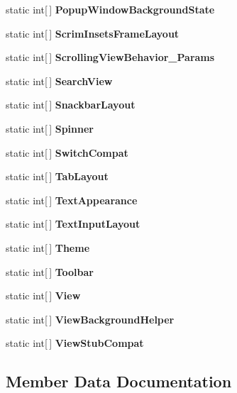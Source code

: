 \begin{DoxyCompactItemize}
static int\mbox{[}$\,$\mbox{]} {\bfseries Popup\+Window\+Background\+State}
\item 
static int\mbox{[}$\,$\mbox{]} {\bfseries Scrim\+Insets\+Frame\+Layout}
\item 
static int\mbox{[}$\,$\mbox{]} {\bfseries Scrolling\+View\+Behavior\+\_\+\+Params}
\item 
static int\mbox{[}$\,$\mbox{]} {\bfseries Search\+View}
\item 
static int\mbox{[}$\,$\mbox{]} {\bfseries Snackbar\+Layout}
\item 
static int\mbox{[}$\,$\mbox{]} {\bfseries Spinner}
\item 
static int\mbox{[}$\,$\mbox{]} {\bfseries Switch\+Compat}
\item 
static int\mbox{[}$\,$\mbox{]} {\bfseries Tab\+Layout}
\item 
static int\mbox{[}$\,$\mbox{]} {\bfseries Text\+Appearance}
\item 
static int\mbox{[}$\,$\mbox{]} {\bfseries Text\+Input\+Layout}
\item 
\hypertarget{classClient_1_1Droid_1_1Resource_1_1Styleable_adf7e6f965f31f895923bda5cad2dd1c1}{}static int\mbox{[}$\,$\mbox{]} {\bfseries Theme}\label{classClient_1_1Droid_1_1Resource_1_1Styleable_adf7e6f965f31f895923bda5cad2dd1c1}

\item 
static int\mbox{[}$\,$\mbox{]} {\bfseries Toolbar}
\item 
static int\mbox{[}$\,$\mbox{]} {\bfseries View}
\item 
static int\mbox{[}$\,$\mbox{]} {\bfseries View\+Background\+Helper}
\item 
static int\mbox{[}$\,$\mbox{]} {\bfseries View\+Stub\+Compat}
\end{DoxyCompactItemize}


\subsection{Member Data Documentation}
\hypertarget{classClient_1_1Droid_1_1Resource_1_1Styleable_a61e7d2ee0017ebbad2ded5ea0fa22edc}{}
